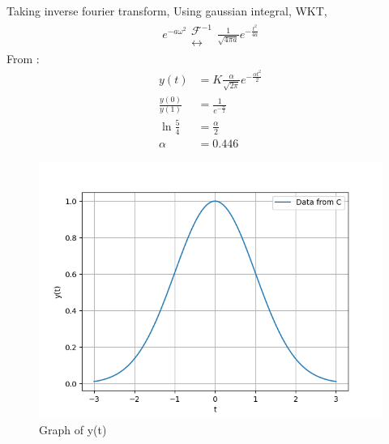 \documentclass[journal,12pt,twocolumn]{IEEEtran}
\theoremstyle{remark}
\begin{document}
Taking inverse fourier transform, Using gaussian integral,
WKT, 
\begin{align}
     e^{-a\omega^2} \mathrel{\substack{\mathcal{F}^{-1}\\\longleftrightarrow}} \frac{1}{\sqrt{4\pi a}} e^{-\frac{t^2}{4a}}
\end{align}
From :
\begin{align}
    y(t) &= K \frac{\alpha}{\sqrt{2\pi}} e^{-\frac{\alpha t^2}{2}}\\
    \frac{y(0)}{y(1)} &= \frac{1}{e^{-\frac{\alpha}{2}}}\\
    \ln\frac{5}{4} &= \frac{\alpha}{2} \\
    \alpha &= 0.446 
\end{align}

\begin{figure}[!h] 
    \centering
    \includegraphics[width=\columnwidth]{figs/graph_of_y(t).png}
    \caption{Graph of y(t)}
    \label{fig:Graph1_gate_CE_30}
    \end{figure}
\end{document}
